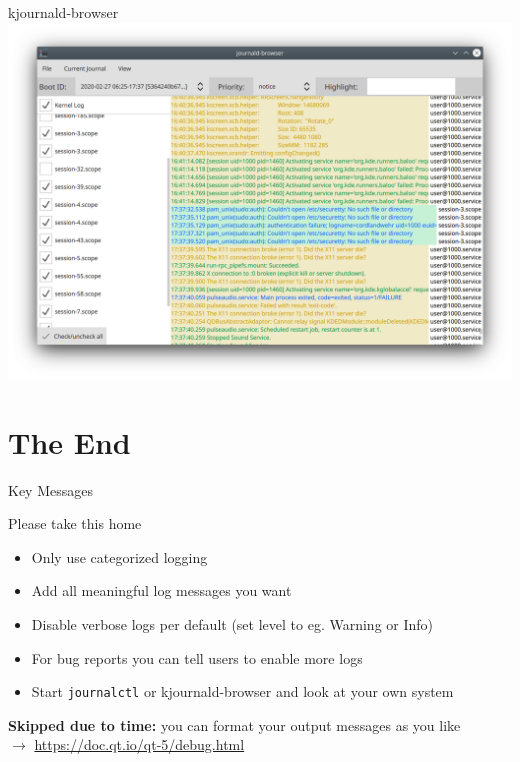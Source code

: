 \documentclass[t,compress,aspectratio=169]{beamer}
\begin{document}
\begin{frame}
    {kjournald-browser}
    \centering
    \vspace{-2.5em}
    \includegraphics[width=.8\textwidth]{kjournaldbrowser}
\end{frame}

\section{The End}
\begin{frame}{Key Messages}
    \begin{block}{Please take this home}
        \begin{itemize}
            \item Only use categorized logging
            \item Add all meaningful log messages you want
            \item Disable verbose logs per default (set level to eg. Warning or Info)
            \item For bug reports you can tell users to enable more logs
            \item Start \texttt{journalctl} or kjournald-browser and look at your own system
        \end{itemize}
    \end{block}
    \bigskip

    \textbf{Skipped due to time:} you can format your output messages as you like\\
    $\rightarrow$ \url{https://doc.qt.io/qt-5/debug.html}
\end{frame}
\end{document}
